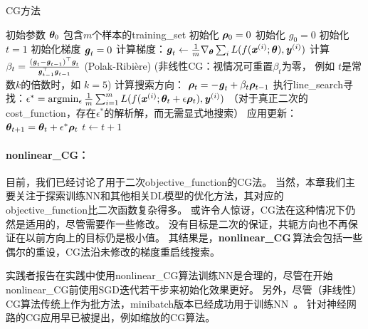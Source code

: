 \begin{algorithm}[ht]
\caption{\gls{CG}方法}
\label{alg:cg}
\begin{algorithmic}
\REQUIRE 初始参数 $\boldsymbol{\theta}_{0}$
\REQUIRE 包含$m$个样本的\gls{training_set}
\STATE 初始化 $\boldsymbol{\rho}_{0} = 0$
\STATE 初始化 $g_0 = 0$
\STATE 初始化 $t = 1$
    \STATE 初始化梯度 ${\boldsymbol{\mathit{g}}}_{t} = 0$
    \STATE 计算梯度：$\boldsymbol{\mathit{g}}_{t} \leftarrow
         \frac{1}{m}\nabla_{\boldsymbol{\theta}} \sum_i L(f(\boldsymbol{\mathit{x}}^{(i)};\boldsymbol{\theta}),\boldsymbol{\mathit{y}}^{(i)})$ 
    \STATE 计算 $\beta_{t} = \frac{(\boldsymbol{\mathit{g}}_{t}-\boldsymbol{\mathit{g}}_{t-1})^\top \boldsymbol{\mathit{g}}_{t}}{\boldsymbol{\mathit{g}}_{t-1}^\top \boldsymbol{\mathit{g}}_{t-1}}$  (Polak-Ribi\`{e}re)
    \STATE (非线性\gls{CG}：视情况可重置$\beta_{t}$为零，
           例如  $t$是常数$k$的倍数时，如 $k=5$)
    \STATE 计算搜索方向： $\boldsymbol{\rho}_{t} = -\boldsymbol{\mathit{g}}_{t} + \beta_{t} \boldsymbol{\rho}_{t-1}$ 
    \STATE 执行\gls{line_search}寻找：$\epsilon^{*} = \arg\!\min_{\epsilon}
    \frac{1}{m} \sum_{i=1}^{m}L(f(\boldsymbol{\mathit{x}}^{(i)};\boldsymbol{\theta}_t + \epsilon \boldsymbol{\rho}_t),\boldsymbol{\mathit{y}}^{(i)})$ 
    \STATE （对于真正二次的\gls{cost_function}，存在$\epsilon^*$的解析解，而无需显式地搜索）
    \STATE 应用更新：$\boldsymbol{\theta}_{t+1} = \boldsymbol{\theta}_{t}+ \epsilon^{*} \boldsymbol{\rho}_{t}$
    \STATE $t \leftarrow t + 1$
\ENDWHILE
\end{algorithmic}
\end{algorithm}


\paragraph{\gls{nonlinear_CG}：}
目前，我们已经讨论了用于二次\gls{objective_function}的\gls{CG}法。
当然，本章我们主要关注于探索训练\gls{NN}和其他相关\gls{DL}模型的优化方法，其对应的\gls{objective_function}比二次函数复杂得多。
或许令人惊讶，\gls{CG}法在这种情况下仍然是适用的，尽管需要作一些修改。
没有目标是二次的保证，共轭方向也不再保证在以前方向上的目标仍是极小值。
其结果是，\textbf{\gls{nonlinear_CG}}\,算法会包括一些偶尔的重设，\gls{CG}法沿未修改的梯度重启线搜索。


实践者报告在实践中使用\gls{nonlinear_CG}算法训练\gls{NN}是合理的，尽管在开始\gls{nonlinear_CG}前使用\gls{SGD}迭代若干步来初始化效果更好。
另外，尽管（非线性）\gls{CG}算法传统上作为批方法，\gls{minibatch}版本已经成功用于训练\gls{NN}~\citep{LeRoux-chapter-2011}。
针对神经网路的\gls{CG}应用早已被提出，例如缩放的\gls{CG}算法\citep{Moller}。

